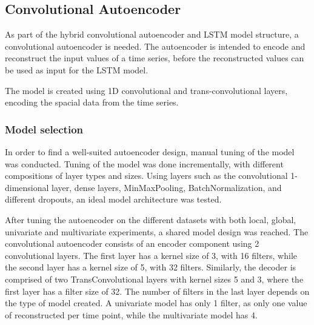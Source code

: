 
\subsection{Convolutional Autoencoder}
\label{section:Method:CNN-AE-LSTM:AE}



As part of the hybrid convolutional autoencoder and LSTM model structure,
a convolutional autoencoder is needed.
The autoencoder is intended to encode and reconstruct the input values of a time series,
before the reconstructed values can be used as input for the LSTM model.

The model is created using 1D convolutional and trans-convolutional layers,
encoding the spacial data from the time series.



\subsubsection{Model selection}

In order to find a well-suited autoencoder design, manual tuning of the model was conducted.
Tuning of the model was done incrementally, with different compositions of layer types and sizes.
Using layers such as the convolutional 1-dimensional layer, dense layers, MinMaxPooling, BatchNormalization, and different dropouts,
an ideal model architecture was tested.

After tuning the autoencoder on the different datasets with both local, global, univariate and multivariate experiments,
a shared model design was reached.
The convolutional autoencoder consists of an encoder component using 2 convolutional layers.
The first layer has a kernel size of 3, with 16 filters, while the second layer has a kernel size of 5, with 32 filters.
Similarly, the decoder is comprised of two TransConvolutional layers with kernel sizes 5 and 3, where the first layer has a filter size of 32.
The number of filters in the last layer depends on the type of model created. A univariate model has only 1 filter, as only one value of reconstructed per time point,
while the multivariate model has 4.

